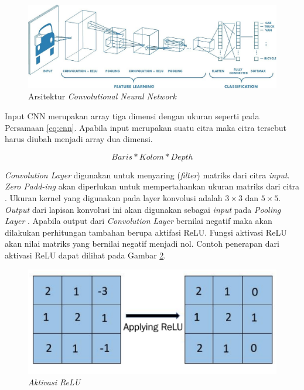 \begin{figure} [ht] \centering
    \includegraphics[width=1\textwidth]{gambar/cnn.jpg}
    \caption{Arsitektur \emph{Convolutional Neural Network}}
    \label{fig:arsitektur cnn}
\end{figure}

Input CNN merupakan array tiga dimensi dengan ukuran seperti pada Persamaan \ref{eq:cnn}. Apabila input merupakan suatu citra maka citra tersebut harus diubah menjadi array dua dimensi. 

\begin{equation}
\label{eq:cnn}
Baris * Kolom * Depth
\end{equation}

\emph{Convolution Layer} digunakan untuk menyaring (\emph{filter}) matriks dari citra \emph{input}. \emph{Zero Padd-ing} akan diperlukan untuk mempertahankan ukuran matriks dari citra \parencite{dwitama2019klasifikasi}. Ukuran kernel yang digunakan pada layer konvolusi adalah \(3 \times 3\) dan \(5 \times 5\). \emph{Output} dari lapisan konvolusi ini akan digunakan sebagai \emph{input} pada \emph{Pooling Layer} \parencite{hakim2018penerapan}. Apabila output dari \emph{Convolution Layer} bernilai negatif maka akan dilakukan perhitungan tambahan berupa aktifasi ReLU. Fungsi aktivasi ReLU akan nilai matriks yang bernilai negatif menjadi nol. Contoh penerapan dari aktivasi ReLU dapat dilihat pada Gambar \ref{fig:Aktivasi ReLU}.

\begin{figure} [ht] \centering
    \includegraphics[width=.6\textwidth]{gambar/relu.png}
    \caption{\emph{Aktivasi ReLU}}
    \label{fig:Aktivasi ReLU}
\end{figure}

